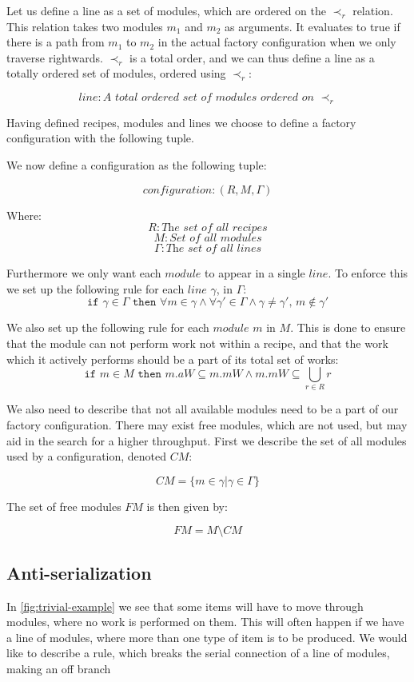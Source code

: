 Let us define a line as a set of modules, which are ordered on the $\prec_r$ relation. This relation takes two modules $m_1$ and $m_2$ as arguments. It evaluates to true if there is a path from $m_1$ to $m_2$ in the actual factory configuration when we only traverse rightwards. $\prec_r$ is a total order, and we can thus define a line as a totally ordered set of modules, ordered using $\prec_r$:

\[line: \textit{A total ordered set of modules ordered on } \prec_r\]

Having defined recipes, modules and lines we choose to define a factory configuration with the following tuple. 

We now define a configuration as the following tuple:

\[configuration: (R, M, \Gamma)\]

Where:
\[R: \textit{The set of all recipes}\]
\[M: \textit{Set of all modules}\]
\[\Gamma: \textit{The set of all lines}\]


Furthermore we only want each $module$ to appear in a single $line$. To enforce this we set up the following rule for each $line$ $\gamma$, in $\Gamma$:
\[\texttt{if } \gamma \in \Gamma \texttt{ then } \forall m \in \gamma \land \forall \gamma ' \in \Gamma \land \gamma \neq \gamma ',\, m \notin \gamma ' \]


We also set up the following rule for each $module$ $m$ in $M$. This is done to ensure that the module can not perform work not within a recipe, and that the work which it actively performs should be a part of its total set of works:
\[\texttt{if } m \in M \texttt{ then } m.aW \subseteq m.mW \land m.mW \subseteq  \bigcup_{r\in R}r\] 

We also need to describe that not all available modules need to be a part of our factory configuration. There may exist free modules, which are not used, but may aid in the search for a higher throughput. First we describe the set of all modules used by a configuration, denoted $CM$:

\[CM = \{m \in \gamma | \gamma \in \Gamma \}\]

The set of free modules $FM$ is then given by:

\[FM = M \setminus CM \]


\subsection{Anti-serialization}
In \cref{fig:trivial-example} we see that some items will have to move through modules, where no work is performed on them. This will often happen if we have a line of modules, where more than one type of item is to be produced. We would like to describe a rule, which breaks the serial connection of a line of modules, making an off branch 


